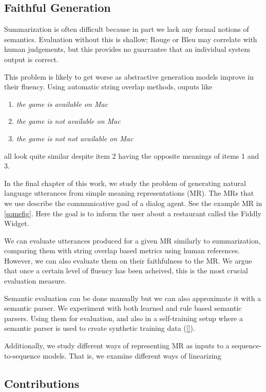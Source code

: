 \subsection{Faithful Generation}


Summarization is often difficult because in part we lack any formal 
notions of semantics. Evaluation without this is shallow; Rouge or 
Bleu may correlate with human judgements, but this provides no guarrantee 
that an individual system output is correct. 


This problem is likely to get worse as abstractive generation models improve
in their fluency. Using automatic string overlap methods, ouputs like
\begin{enumerate}
    \item \textit{the game is available on Mac}
    \item \textit{the game is not available on Mac}
    \item \textit{the game is not not available on Mac}
\end{enumerate}
all look quite similar despite item 2 having the opposite meanings of 
items 1 and 3. 

In the final chapter of this work, 
we study the problem of generating natural language 
utterances from simple meaning representations (MR).  
The MRs that we use describe the communicative goal 
of a dialog agent. See the example MR in \autoref{somefig}. Here 
the goal is to inform the user about a restaurant called the Fiddly Widget.

We can evaluate utterances produced for a given MR similarly to summarization,
comparing them with string overlap based metrics using human references.
However, we can also evaluate them on their faithfulness to the MR. We
argue that once a certain level of fluency has been acheived, this is the
most crucial evaluation measure. 

Semantic evaluation can be done manually but we can also approximate it 
with a semantic parser. We experiment with both learned and rule based 
semantic parsers. Using them for evaluation, and also in a self-training
setup where a semantic parser is used to create synthetic training data
(\autoref{}).


Additionally, we study different ways of representing MR as inputs
to a sequence-to-sequence models. That is, we examine different 
ways of linearizing 




\subsection{Contributions}

